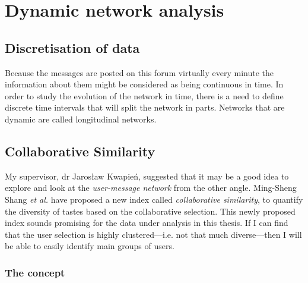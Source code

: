\section{Dynamic network analysis}

  \subsection{Discretisation of data}
  
    Because the messages are posted on this forum virtually every minute the information about them might be considered as being continuous in time. In order to study the evolution of the network in time, there is a need to define discrete time intervals that will split the network in parts. Networks that are dynamic are called longitudinal networks.

  \subsection{Collaborative Similarity}
    
    My supervisor, dr Jarosław Kwapień, suggested that it may be a good idea to explore and look at the \emph{user-message network} from the other angle. Ming-Sheng Shang \textit{et al.} have proposed a new index called \emph{collaborative similarity}, to quantify the diversity of tastes based on the collaborative selection.\cite{Shang2010} This newly proposed index sounds promising for the data under analysis in this thesis. If I can find that the user selection is highly clustered---i.e. not that much diverse---then I will be able to easily identify main groups of users.
    
    \subsubsection{The concept}
    
